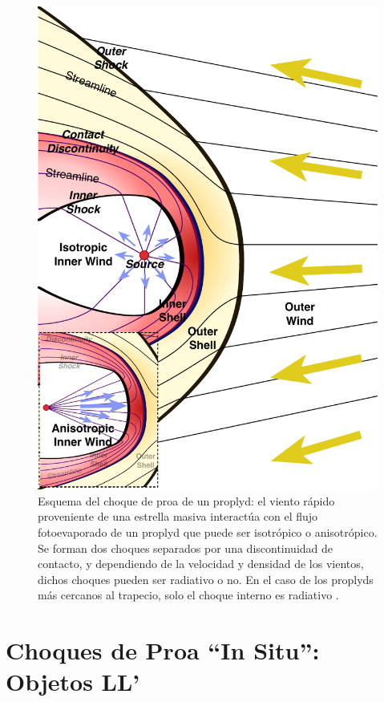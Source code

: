 \begin{figure}
  \centering
  \includegraphics[width=0.7\linewidth]{./Figures/generic-bowshock}
  \caption{Esquema del choque de proa de un proplyd: el viento rápido proveniente de una estrella masiva interactúa con el flujo fotoevaporado de un proplyd que puede ser isotrópico o anisotrópico. Se forman dos choques separados por una discontinuidad de contacto, y dependiendo de la velocidad y densidad de los vientos, dichos choques pueden ser radiativo o no. En el caso de los proplyds más cercanos al trapecio, solo el choque interno es radiativo \citep{Henney:2017}.}
  \label{fig:generic-bowshock}
\end{figure}

\section[Objetos LL]{Choques de Proa ``In Situ'': Objetos LL'}
\label{sec:Luis-LL}

